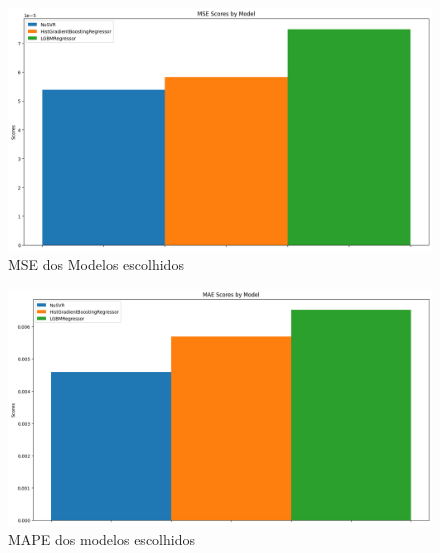 \documentclass[journal]{IEEEtran}
\begin{document}
\begin{figure}[H]
    \centering
    \includegraphics[width=1\linewidth]{7.png}
    \caption{MSE dos Modelos escolhidos}
\end{figure}

\begin{figure}[H]
    \centering
    \includegraphics[width=1\linewidth]{9.png}
    \caption{MAPE dos modelos escolhidos}
\end{figure}
\end{document}
